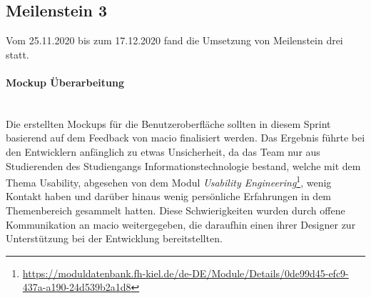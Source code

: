 \documentclass[10pt, a4paper]{article}
\begin{document}
\begin{onehalfspace}
\subsection{Meilenstein 3}
Vom 25.11.2020 bis zum 17.12.2020 fand die Umsetzung von Meilenstein drei statt.

\paragraph*{Mockup Überarbeitung} $~$ \\
Die erstellten Mockups für die Benutzeroberfläche sollten in diesem Sprint basierend auf dem Feedback von macio finalisiert werden.
Das Ergebnis führte bei den Entwicklern anfänglich zu etwas Unsicherheit, da das Team nur aus Studierenden des Studiengangs
Informationstechnologie bestand, welche mit dem Thema Usability, abgesehen von dem Modul
\textit{Usability Engineering}\footnote{\raggedright\url{https://moduldatenbank.fh-kiel.de/de-DE/Module/Details/0de99d45-efc9-437a-a190-24d539b2a1d8}},
wenig Kontakt haben und darüber hinaus wenig persönliche Erfahrungen in dem Themenbereich gesammelt hatten.
Diese Schwierigkeiten wurden durch offene Kommunikation an macio weitergegeben,
die daraufhin einen ihrer Designer zur Unterstützung bei der Entwicklung bereitstellten.


\end{onehalfspace}
\end{document}
